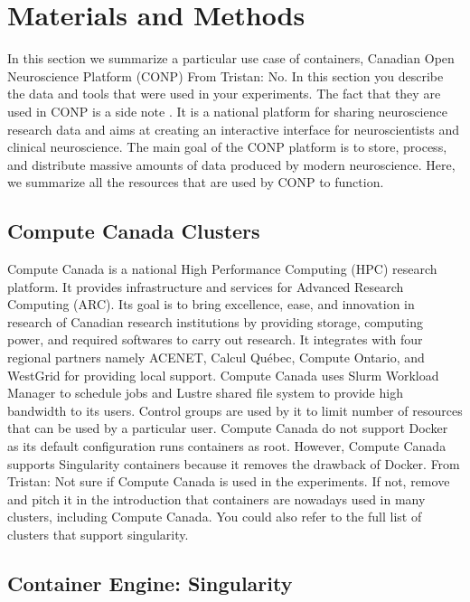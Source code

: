 \documentclass[a4paper,num-refs]{oup-contemporary}
\newcommand{\TG}[1]{\color{blue}From Tristan: #1 \color{black}}
\begin{document}
\section{Materials and Methods}

In this section we summarize a particular use case of containers, Canadian
Open Neuroscience Platform (CONP) \TG{No. In this section you describe the data and tools 
that were used in your experiments. The fact that they are used in CONP 
is a side note}. It is a national platform for sharing neuroscience
research data and aims at creating an interactive interface for neuroscientists and
clinical neuroscience. The main goal of the CONP platform is to store, process, and
distribute massive amounts of data produced by modern neuroscience.
Here, we summarize all the resources that are
used by CONP to function.

\subsection{Compute Canada Clusters}

Compute Canada is a national High Performance Computing (HPC) research platform.
It provides infrastructure and services for Advanced Research Computing (ARC).
Its goal is to bring excellence, ease, and innovation in research of Canadian
research institutions by providing storage, computing power, and required
softwares to carry out research.
It integrates with four regional partners namely ACENET, Calcul Québec, Compute
Ontario, and WestGrid for providing local support.
Compute Canada uses Slurm Workload Manager to schedule jobs and Lustre shared
file system to provide high bandwidth to its users.
Control groups are used by it to limit number of resources that can be used
by a particular user.
Compute Canada do not support Docker as its default configuration
runs containers as root. However, Compute Canada supports Singularity
containers because it removes the drawback of Docker.
\TG{Not sure if Compute Canada is used in the experiments. If not, remove and 
pitch it in the introduction that containers are nowadays used in many clusters, including 
Compute Canada. You could also refer to the full list of clusters that support singularity.}

\subsection{Container Engine: Singularity}
\end{document}
